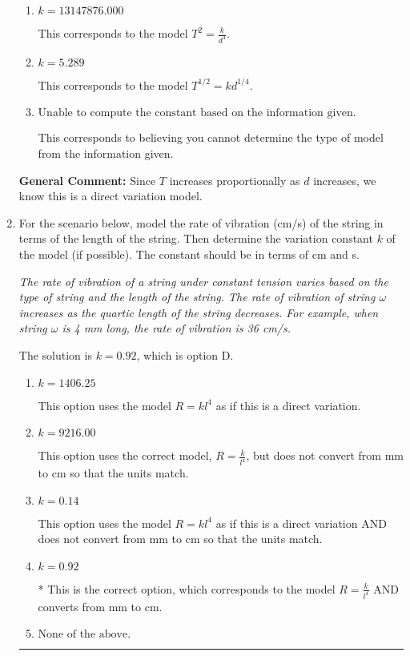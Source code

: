 \documentclass{extbook}[14pt]
\newcommand{\litem}[1]{\item #1

\rule{\textwidth}{0.4pt}}
\begin{document}
\begin{enumerate}
{\begin{enumerate}[label=\Alph*.]
* This is the correct option corresponding to the model $T^{2} = k d^{4}$.
\item \( k = 13147876.000 \)

This corresponds to the model $T^{2} = \frac{k}{d^{4}}$.
\item \( k = 5.289 \)

This corresponds to the model $T^{1/2} = k d^{1/4}$.
\item \( \text{Unable to compute the constant based on the information given.} \)

This corresponds to believing you cannot determine the type of model from the information given.
\end{enumerate}

\textbf{General Comment:} Since $T$ increases proportionally as $d$ increases, we know this is a direct variation model.
}
\litem{
For the scenario below, model the rate of vibration (cm/s) of the string in terms of the length of the string. Then determine the variation constant $k$ of the model (if possible). The constant should be in terms of cm and s.

\begin{center}
    \textit{ The rate of vibration of a string under constant tension varies based on the type of string and the length of the string. The rate of vibration of string $\omega$ increases as the quartic length of the string decreases. For example, when string $\omega$ is 4 mm long, the rate of vibration is 36 cm/s. }
\end{center}
The solution is \( k = 0.92 \), which is option D.\begin{enumerate}[label=\Alph*.]
\item \( k = 1406.25 \)

This option uses the model $R = kl^{4}$ as if this is a direct variation.
\item \( k = 9216.00 \)

This option uses the correct model, $R = \frac{k}{l^{4}}$, but does not convert from mm to cm so that the units match.
\item \( k = 0.14 \)

This option uses the model $R = kl^{4}$ as if this is a direct variation AND does not convert from mm to cm so that the units match.
\item \( k = 0.92 \)

* This is the correct option, which corresponds to the model $R = \frac{k}{l^{4}}$ AND converts from mm to cm.
\item \( \text{None of the above.} \)


\end{enumerate}}
\end{enumerate}
\end{document}
